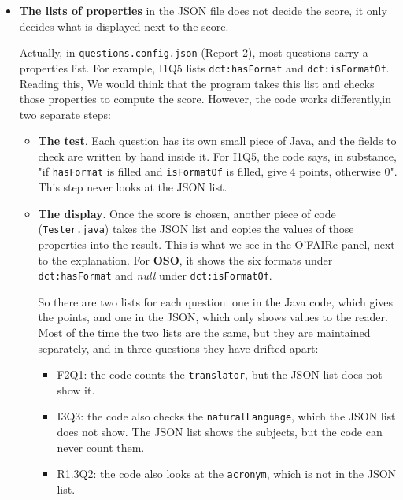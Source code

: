 \documentclass[11pt,a4paper]{article}
\begin{document}
\begin{itemize}
  \item \textbf{The lists of properties} in the JSON file does not decide the score, it only decides what is displayed next to the score.
  
  Actually, in \texttt{questions.config.json} (Report 2), most questions carry a properties list. 
  For example, I1Q5 lists \texttt{dct:hasFormat} and \texttt{dct:isFormatOf}.
  Reading this, We would think that the program takes this list and checks those properties to compute the score.
  However, the code works differently,in two separate steps:
 \begin{itemize}
  \item
  \textbf{The test}. 
  Each question has its own small piece of Java, and the fields to check are written by hand inside it.
  For I1Q5, the code says, in substance, "if \texttt{hasFormat} is filled and \texttt{isFormatOf} is filled, give 4 points, otherwise 0". 
  This step never looks at the JSON list.
  \item
  \textbf{The display}. 
  Once the score is chosen, another piece of code (\texttt{Tester.java}) takes the JSON list and
  copies the values of those properties into the result. This is what we see in the O'FAIRe panel, next to the explanation. 
  For \textbf{OSO}, it shows the six formats under \texttt{dct:hasFormat} and \textit{null} under \texttt{dct:isFormatOf}.
  
So there are two lists for each question: one in the Java code, which gives the points, and one in the JSON, which only shows values to the reader.
Most of the time the two lists are the same, but they are maintained separately, and in three questions they have drifted apart:
\begin{itemize}
  \item F2Q1: the code counts the \texttt{translator}, but the JSON list does not show it.
  \item I3Q3: the code also checks the \texttt{naturalLanguage}, which the JSON list does not show. The JSON list shows the subjects, but the code can never count them.
  \item R1.3Q2: the code also looks at the \texttt{acronym}, which is not in the JSON list.
\end{itemize}
\end{itemize}


\end{itemize}
\end{document}
